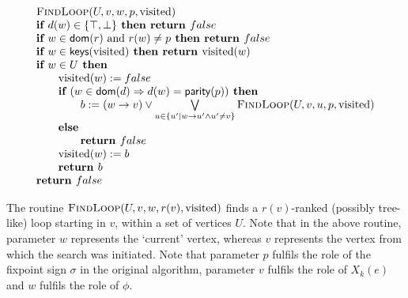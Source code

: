 \documentclass{article}
\begin{document}
\begin{equation*}
\begin{array}{l}
\text{\textsc{FindLoop}}(U,v,w,p,\text{visited})\\  %
\textbf{if } d(w) \in\{\top,\bot\} \textbf{ then return } false \\
\textbf{if } w \in \mathsf{dom}(r) \text{ and } r(w) \neq p \textbf{ then return } false \\
\textbf{if } w \in \mathsf{keys}(\text{visited}) \textbf{ then return } \text{visited}(w) \\
\textbf{if } w \in U \textbf{ then }\\
\qquad \text{visited}(w) := false\\
\qquad \textbf{if } (w \in \mathsf{dom}(d) \Rightarrow d(w) = \textsf{parity}(p)) \textbf{ then }\\
\qquad \qquad b := (w \to v) \vee \bigvee\limits_{u \in \{ u' \mid w \to u' \wedge u' \neq v \}} \textsc{FindLoop}(U,v, u, p, \text{visited}) \\
\qquad \textbf{else } \\
\qquad \qquad \textbf{return } false \\
\qquad \text{visited}(w) := b\\
\qquad \textbf{return } b\\
\textbf{return $false$}
\end{array}
\end{equation*}


The routine $\textsc{FindLoop}(U,v,w,r(v),\text{visited})$ finds a
$r(v)$-ranked (possibly tree-like) loop starting in $v$, within a set of vertices
$U$. Note that in the above routine, parameter $w$ represents the `current' vertex,
whereas $v$ represents the vertex from which the search was initiated.  Note that 
parameter $p$ fulfils the role
of the fixpoint sign $\sigma$ in the original algorithm, parameter $v$ fulfils
the role of $X_k(e)$ and $w$ fulfils the role of $\phi$. 
\end{document}
